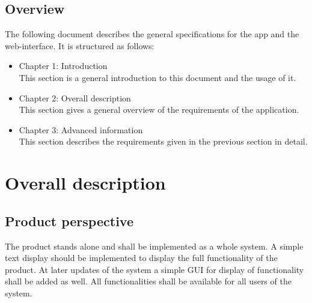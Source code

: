 \documentclass[a4paper]{report}
\begin{document}
\section{Overview}
The following document describes the general specifications for the app and the web-interface. It is structured as follows: 
\begin{itemize}
    \item Chapter 1: Introduction\\
    This section is a general introduction to this document and the usage of it.
    \item Chapter 2: Overall description\\
    This section gives a general overview of the requirements of the application.
    \item Chapter 3: Advanced information\\
    This section describes the requirements given in the previous section in detail.
\end{itemize}

\newpage
\chapter{Overall description}

\section{Product perspective}
The product stands alone and shall be implemented as a whole system. A simple text display should be implemented to display the full functionality of the product. At later updates of the system a simple GUI for display of functionality shall be added as well. All functionalities shall be available for all users of the system.
\end{document}
